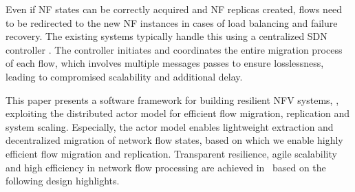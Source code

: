 Even if NF states can be correctly acquired and NF replicas created, flows need to be redirected to the new NF instances in cases of load balancing and failure recovery. The existing systems typically handle this using a centralized SDN controller \cite{gember2015opennf, rajagopalan2013split}. %
The controller initiates and coordinates the entire migration process of each flow, which involves multiple messages passes to ensure losslessness, leading to compromised scalability and additional delay. %



This paper presents a software framework for building resilient NFV systems, \nfactor, exploiting the distributed actor model \cite{actor-wiki, akka, newell2016optimizing} for efficient flow migration, replication and system scaling. %
Especially, the actor model enables %
 lightweight extraction and decentralized migration of network flow states, based on which we enable highly efficient flow migration and replication.
Transparent resilience, agile scalability and high efficiency in network flow processing are achieved in \nfactor~based on the following design highlights.

